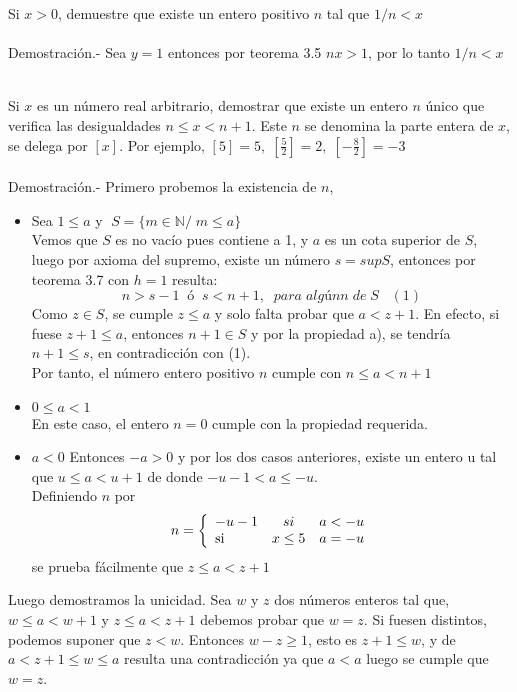 \begin{teo}
Si $x>0$, demuestre que existe un entero positivo $n$ tal que $1/n<x$\\\\
Demostración.- \; Sea $y=1$ entonces por teorema 3.5 \; $nx>1$, por lo tanto $1/n<x$ \\\\
\end{teo}

\begin{teo}
Si $x$ es un número real arbitrario, demostrar que existe un entero $n$ único que verifica las desigualdades $n\leq x < n+1$. Este $n$ se denomina la parte entera de $x$, se delega por $[x]$. Por ejemplo, $[5]=5,\; \left[ \frac{5}{2}\right] =2, \; \left[ -\frac{8}{2} \right]=-3$\\\\
Demostración.-\; Primero probemos la existencia de $n$,
\begin{itemize}
\item  Sea $1\leq a $  \; y  \; $\; S=\lbrace m \in \mathbb{N}/\; m \leq a \rbrace$\\ 
Vemos que $S$ es no vacío pues contiene a 1, y \; $a$ \; es un cota superior de $S$, luego por axioma del supremo, existe un número $s=supS$, entonces por teorema 3.7 \; con $h=1$ resulta:
$$n>s-1 \; \; ó \; \; s<n+1, \; \; para \; algún n \; de \; S \; \; \; (1) $$
Como $z \in S$, se cumple $z\leq a$ y solo falta probar que $a<z+1$. En efecto, si fuese $z+1\leq a$, entonces $n+1 \in S$ y por la propiedad a), se tendría $n+1\leq s$, en contradicción con (1).   \\
Por tanto, el número entero positivo $n$ cumple con $n\leq a < n+1$
\item $0\leq a < 1$\\
En este caso, el entero $n=0$ cumple con la propiedad requerida.
\item $a<0$
Entonces $-a>0$ \; y por los dos casos anteriores, existe un entero u tal que $u\leq a< u+1$ de donde $-u-1<a\leq -u$.\\
Definiendo $n$ por  
\begin{equation}
n = \left\lbrace
\begin{array}{lcr}
-u-1 & si & a<-u\\
\textup{si } & x\leq 5 & a=-u
\end{array}        
\right.
\end{equation}
se prueba fácilmente que $z\leq a < z+1$
\end{itemize}
Luego demostramos la unicidad. Sea $w$ y $z$ dos números enteros tal que, $w\leq a < w + 1$ y $z \leq a < z + 1$ debemos probar que $w=z$. Si fuesen distintos, podemos suponer que $z<w$. Entonces $w-z\geq 1$, esto es $z+1\leq w$, y de $a<z+1\leq w \leq a$ resulta una contradicción ya que $a<a$ luego se cumple que $w=z$. \\\\ 
\end{teo}


